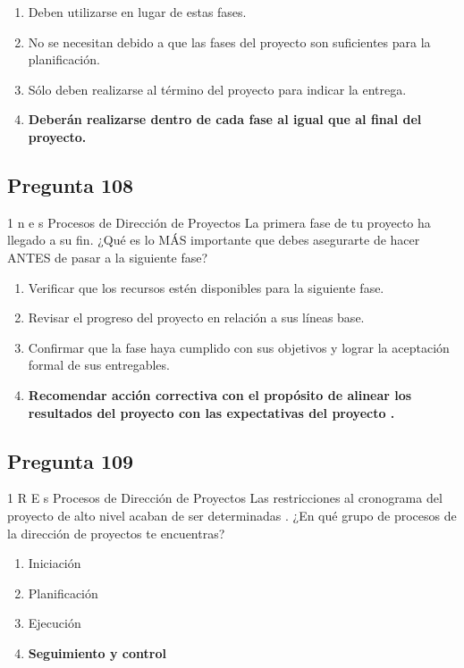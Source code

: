 \documentclass[11pt,a4paper]{article}
\begin{document}
\begin{enumerate}[label=\alph*)]
  \item Deben utilizarse en lugar de estas fases.
  \item No se necesitan debido a que las fases del proyecto son suficientes para la planificación.
  \item Sólo deben realizarse al término del proyecto para indicar la entrega.
  \item \textbf{Deberán realizarse dentro de cada fase al igual que al final del proyecto.}
\end{enumerate}

\subsection*{Pregunta 108}
1 n e s Procesos de Dirección de Proyectos La primera fase de tu proyecto ha llegado a su fin. ¿Qué es lo MÁS importante que debes asegurarte de hacer ANTES de pasar a la siguiente fase?

\begin{enumerate}[label=\alph*)]
  \item Verificar que los recursos estén disponibles para la siguiente fase.
  \item Revisar el progreso del proyecto en relación a sus líneas base.
  \item Confirmar que la fase haya cumplido con sus objetivos y lograr la aceptación formal de sus entregables.
  \item \textbf{Recomendar acción correctiva con el propósito de alinear los resultados del proyecto con las expectativas del proyecto .}
\end{enumerate}

\subsection*{Pregunta 109}
1 R E s Procesos de Dirección de Proyectos Las restricciones al cronograma del proyecto de alto nivel acaban de ser determinadas . ¿En qué grupo de procesos de la dirección de proyectos te encuentras?

\begin{enumerate}[label=\alph*)]
  \item Iniciación
  \item Planificación
  \item Ejecución
  \item \textbf{Seguimiento y control}
\end{enumerate}
\end{document}
